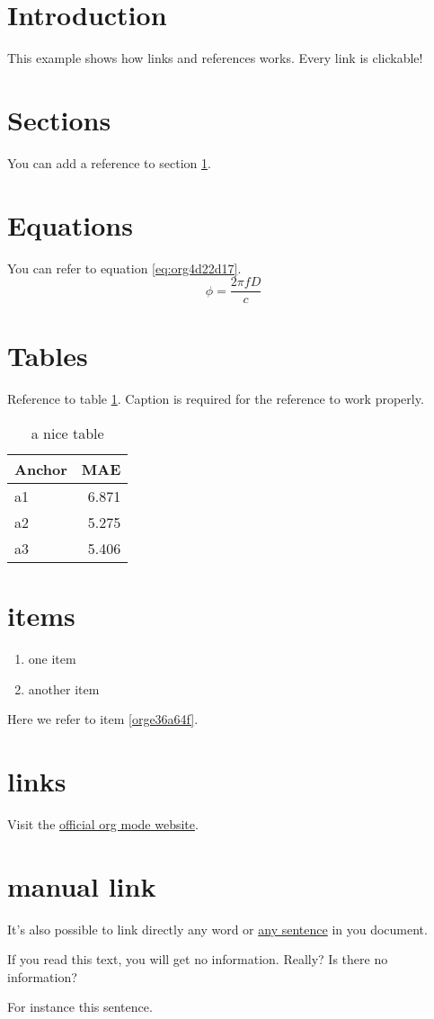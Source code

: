 


\section{Introduction}
\label{sec:org141a45c}
This example shows how links and references works.
Every link is clickable!

\section{Sections}
\label{sec:org6cc9b40}
You can add a reference to section \ref{sec:org141a45c}.

\section{Equations}
\label{sec:orgfa7f47c}
You can refer to equation \ref{eq:org4d22d17}.
\begin{equation}
\label{eq:org4d22d17}
\phi = \frac{2\pi fD}{c}
\end{equation}

\section{Tables}
\label{sec:orgeecc805}
Reference to table \ref{tab:orgf94330e}.
Caption is required for the reference to work properly.

\begin{table}[htbp]
\caption{\label{tab:orgf94330e}
a nice table}
\centering
\begin{tabular}{lr}
Anchor & MAE\\
\hline
a1 & 6.871\\
a2 & 5.275\\
a3 & 5.406\\
\end{tabular}
\end{table}

\section{items}
\label{sec:org611604b}
\begin{enumerate}
\item one item
\item \label{orge36a64f}another item
\end{enumerate}
Here we refer to item \ref{orge36a64f}.

\section{links}
\label{sec:org5db3c6e}
Visit the \href{https://orgmode.org/}{official org mode website}.

\section{manual link}
\label{sec:orgfcb12d9}
It's also possible to link directly any word
or \hyperlink{thesentence}{any sentence} in you document.

If you read this text, you will get no information.  Really?
Is there no information?

For instance \hypertarget{thesentence}{this sentence}.


